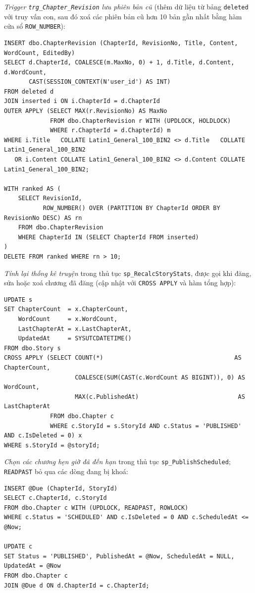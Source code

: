 \textit{Trigger \texttt{trg\_Chapter\_Revision} lưu phiên bản cũ} (thêm dữ liệu từ bảng \texttt{deleted} với truy vấn con, sau đó xoá các phiên bản cũ hơn 10 bản gần nhất bằng hàm cửa sổ \texttt{ROW\_NUMBER}):
\begin{verbatim}
INSERT dbo.ChapterRevision (ChapterId, RevisionNo, Title, Content, WordCount, EditedBy)
SELECT d.ChapterId, COALESCE(m.MaxNo, 0) + 1, d.Title, d.Content, d.WordCount,
       CAST(SESSION_CONTEXT(N'user_id') AS INT)
FROM deleted d
JOIN inserted i ON i.ChapterId = d.ChapterId
OUTER APPLY (SELECT MAX(r.RevisionNo) AS MaxNo
             FROM dbo.ChapterRevision r WITH (UPDLOCK, HOLDLOCK)
             WHERE r.ChapterId = d.ChapterId) m
WHERE i.Title   COLLATE Latin1_General_100_BIN2 <> d.Title   COLLATE Latin1_General_100_BIN2
   OR i.Content COLLATE Latin1_General_100_BIN2 <> d.Content COLLATE Latin1_General_100_BIN2;

WITH ranked AS (
    SELECT RevisionId,
           ROW_NUMBER() OVER (PARTITION BY ChapterId ORDER BY RevisionNo DESC) AS rn
    FROM dbo.ChapterRevision
    WHERE ChapterId IN (SELECT ChapterId FROM inserted)
)
DELETE FROM ranked WHERE rn > 10;
\end{verbatim}

\textit{Tính lại thống kê truyện} trong thủ tục \texttt{sp\_RecalcStoryStats}, được gọi khi đăng, sửa hoặc xoá chương đã đăng (cập nhật với \texttt{CROSS APPLY} và hàm tổng hợp):
\begin{verbatim}
UPDATE s
SET ChapterCount  = x.ChapterCount,
    WordCount     = x.WordCount,
    LastChapterAt = x.LastChapterAt,
    UpdatedAt     = SYSUTCDATETIME()
FROM dbo.Story s
CROSS APPLY (SELECT COUNT(*)                                     AS ChapterCount,
                    COALESCE(SUM(CAST(c.WordCount AS BIGINT)), 0) AS WordCount,
                    MAX(c.PublishedAt)                            AS LastChapterAt
             FROM dbo.Chapter c
             WHERE c.StoryId = s.StoryId AND c.Status = 'PUBLISHED' AND c.IsDeleted = 0) x
WHERE s.StoryId = @storyId;
\end{verbatim}

\textit{Chọn các chương hẹn giờ đã đến hạn} trong thủ tục \texttt{sp\_PublishScheduled}; \texttt{READPAST} bỏ qua các dòng đang bị khoá:
\begin{verbatim}
INSERT @Due (ChapterId, StoryId)
SELECT c.ChapterId, c.StoryId
FROM dbo.Chapter c WITH (UPDLOCK, READPAST, ROWLOCK)
WHERE c.Status = 'SCHEDULED' AND c.IsDeleted = 0 AND c.ScheduledAt <= @Now;

UPDATE c
SET Status = 'PUBLISHED', PublishedAt = @Now, ScheduledAt = NULL, UpdatedAt = @Now
FROM dbo.Chapter c
JOIN @Due d ON d.ChapterId = c.ChapterId;
\end{verbatim}

